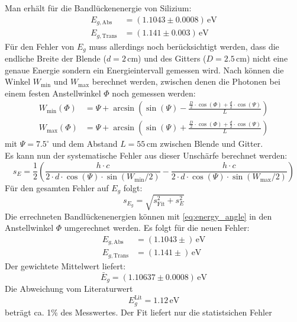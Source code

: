 Man erhält für die Bandlückenenergie von Silizium:
\begin{equation}
\begin{split}
  E_{g, \text{Abs}} &= (1.1043 \pm 0.0008)\,\text{eV} \\
  E_{g, \text{Trans}} &= (1.141 \pm 0.003)\,\text{eV}
\end{split}
\end{equation}
Für den Fehler von $E_g$ muss allerdings noch berücksichtigt werden, dass die endliche Breite der Blende ($d=2$\,cm) und 
des Gitters ($D=2.5$\,cm) nicht eine genaue Energie sondern ein Energieintervall gemessen wird. Nach \cite{staatsex} können 
die Winkel $W_\text{min}$ und $W_\text{max}$ berechnet werden, zwischen denen die Photonen bei einem festen Anstellwinkel $\Phi$ noch 
gemessen werden:
\begin{equation}
\begin{split}
  W_\text{min}(\Phi) &= \Psi + \arcsin \left( \sin(\Psi) - \frac{\frac{D}{2} \cdot \cos(\Phi) + \frac{d}{2} \cdot \cos(\Psi)}{L} \right) \\
  W_\text{max}(\Phi) &= \Psi + \arcsin \left( \sin(\Psi) + \frac{\frac{D}{2} \cdot \cos(\Phi) + \frac{d}{2} \cdot \cos(\Psi)}{L} \right) 
\end{split}
\end{equation}
mit $\Psi=7.5^\circ$ und dem Abstand $L=55$\,cm zwischen Blende und Gitter. \\
Es kann nun der systematische Fehler aus dieser Unschärfe berechnet werden:
\begin{equation}
  s_E = \frac{1}{2} \left( \frac{h \cdot c}{2 \cdot d \cdot \cos(\Psi) \cdot \sin (W_\text{min} / 2)} - \frac{h \cdot c}{2 \cdot d \cdot \cos(\Psi) \cdot \sin (W_\text{max} / 2)} \right) 
\end{equation}
Für den gesamten Fehler auf $E_g$ folgt:
\begin{equation}
  s_{E_g} = \sqrt{s_\text{Fit}^2 + s_E^2}
\end{equation}
Die errechneten Bandlückenenergien können mit \autoref{eq:energy_angle} in den Anstellwinkel $\Phi$ umgerechnet werden. Es folgt für die 
neuen Fehler:
\begin{equation}
\begin{split}
  E_{g, \text{Abs}} &= (1.1043 \pm )\,\text{eV} \\
  E_{g, \text{Trans}} &= (1.141 \pm )\,\text{eV}
\end{split}
\end{equation}
Der gewichtete Mittelwert liefert:
\begin{equation}
  \bar{E}_g = (1.10637 \pm 0.0008)\,\text{eV}
\end{equation}
Die Abweichung vom Literaturwert
\begin{equation}
  E_g^{\text{Lit}} = 1.12\,\text{eV}
\end{equation}
beträgt ca. 1\% des Messwertes. Der Fit liefert nur die statistsichen Fehler 



